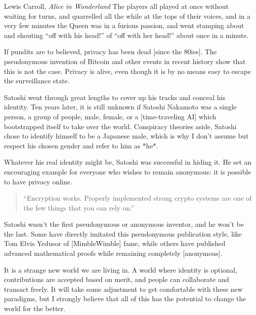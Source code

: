 \label{les:19}

\begin{chapquote}{Lewis Carroll, \textit{Alice in Wonderland}}
The players all played at once without waiting for turns, and quarrelled all
the while at the tops of their voices, and in a very few minutes the Queen was
in a furious passion, and went stamping about and shouting ``off with his
head!'' of ``off with her head!'' about once in a minute.
\end{chapquote}

If pundits are to believed, privacy has been dead [since the 80ies]. The
pseudonymous invention of Bitcoin and other events in recent history
show that this is not the case. Privacy is alive, even though it is by
no means easy to escape the surveillance state.

Satoshi went through great lengths to cover up his tracks and conceal
his identity. Ten years later, it is still unknown if Satoshi Nakamoto
was a single person, a group of people, male, female, or a
[time-traveling AI] which bootstrapped itself to take over the world.
Conspiracy theories aside, Satoshi chose to identify himself to be a
Japanese male, which is why I don't assume but respect his chosen gender
and refer to him as *he*.


Whatever his real identity might be, Satoshi was successful in hiding
it. He set an encouraging example for everyone who wishes to remain
anonymous: it is possible to have privacy online.

\begin{quotation}
``Encryption works. Properly implemented strong crypto systems are one
of the few things that you can rely on.''
\end{quotation}

Satoshi wasn't the first pseudonymous or anonymous inventor, and he
won't be the last. Some have directly imitated this pseudonymous
publication style, like Tom Elvis Yedusor of [MimbleWimble] fame, while
others have published advanced mathematical proofs while remaining
completely [anonymous].

It is a strange new world we are living in. A world where identity is
optional, contributions are accepted based on merit, and people can
collaborate and transact freely. It will take some adjustment to get
comfortable with these new paradigms, but I strongly believe that all of
this has the potential to change the world for the better.

